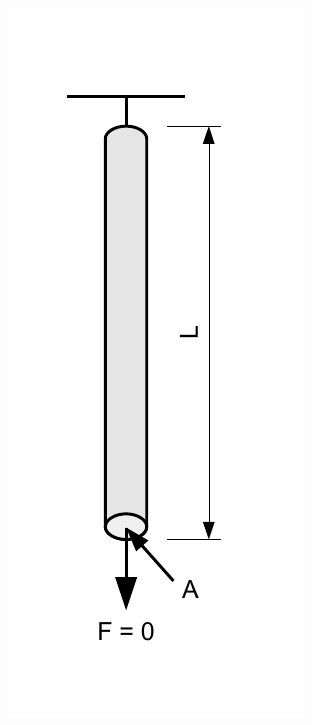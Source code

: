 \documentclass[a4paper, 10pt]{scrartcl}
\begin{document}
\begin{minipage}{3cm}
	\includegraphics[scale=0.6]{images/elasticity_robe.pdf}
\end{minipage}
\hfill
\end{document}
